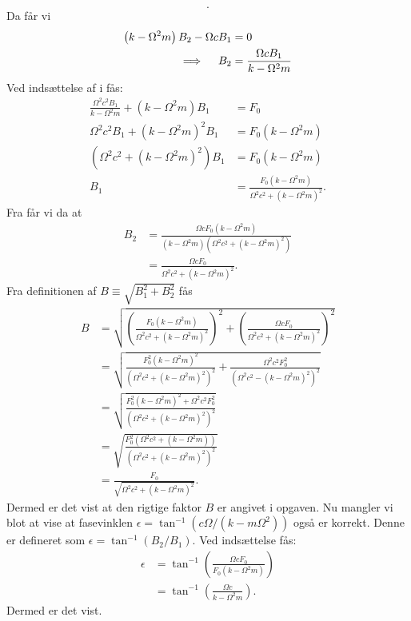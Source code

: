 \begin{derivation}
\[  .\]
  Da får vi
  \begin{align}
    \left( k - \Omega^2 m \right)B_2 - \Omega c B_1 &= 0 \notag \\
    \implies \quad B_2 &= \frac{\Omega c B_1}{k - \Omega^2 m} \label{eq:41b}
  \end{align}
  Ved indsættelse af  i  fås:
  \begin{align*}
    \frac{\Omega^2 c^2 B_1}{k - \Omega^2 m} + \left( k - \Omega^2 m \right)B_1 &= F_0 \\
    \Omega^2 c^2 B_1 + \left( k - \Omega^2 m \right)^2 B_1 &= F_0 \left( k - \Omega^2 m \right) \\
    \left( \Omega^2 c^2 + \left( k - \Omega^2 m \right)^2 \right)B_{1} &= F_0 \left( k - \Omega^2 m \right) \\
    B_1 &= \frac{F_0 \left( k - \Omega^2 m \right)}{\Omega^2 c^2 + \left( k - \Omega^2 m \right)^2}
  .\end{align*}
  Fra  får vi da at
  \begin{align*}
    B_2 &= \frac{\Omega c F_0 \left( k - \Omega^2 m \right)}{\left( k - \Omega^2 m \right) \left( \Omega^2 c^2 + \left( k - \Omega^2 m \right)^2 \right)} \\
        &= \frac{\Omega c F_0}{\Omega^2 c^2 + \left( k - \Omega^2 m \right)^2}
  .\end{align*}
  Fra definitionen af $B \equiv \sqrt{B_1^2 + B_2^2}$ fås
  \begin{align*}
    B &= \sqrt{\left( \frac{F_0 \left( k - \Omega^2 m \right)}{\Omega^2 c^2 + \left( k - \Omega^2 m \right)^2} \right)^2 + \left( \frac{\Omega c F_0}{\Omega^2 c^2 + \left( k - \Omega^2 m \right)^2} \right)^2} \\
      &= \sqrt{\frac{F_0^2 \left( k - \Omega^2 m \right)^2}{\left( \Omega^2 c^2 + \left( k - \Omega^2 m \right)^2 \right)^2} + \frac{\Omega^2 c^2 F_0^2}{\left( \Omega^2 c^2 - \left( k - \Omega^2 m \right)^2 \right)^2}}\\
    &= \sqrt{\frac{F_0^2 \left( k - \Omega^2 m \right)^2 + \Omega^2 c^2 F_0^2}{\left( \Omega^2 c^2 + \left( k - \Omega^2 m \right)^2 \right)^2}} \\
    &= \sqrt{\frac{F_0^2 \left( \Omega^2 c^2 + \left( k - \Omega^2 m \right) \right)}{\left( \Omega^2 c^2 + \left( k - \Omega^2 m \right)^2 \right)^2}} \\
    &= \frac{F_0}{\sqrt{\Omega^2 c^2 + \left( k - \Omega^2 m \right)^2}}
  .\end{align*}
  Dermed er det vist at den rigtige faktor $B$ er angivet i opgaven.
  Nu mangler vi blot at vise at fasevinklen $\epsilon = \tan^{-1} \left( c \Omega / \left( k - m \Omega^2 \right) \right)$ også er korrekt.
  Denne er defineret som $\epsilon = \tan^{-1} \left( B_2 / B_1 \right)$.
  Ved indsættelse fås:
  \begin{align*}
  \epsilon &= \tan^{-1} \left( \frac{\Omega c F_0}{F_0 \left( k - \Omega^2 m \right)} \right) \\
           &= \tan^{-1} \left( \frac{\Omega c}{k - \Omega^2 m} \right)
  .\end{align*}
  Dermed er det vist.
\end{derivation}

